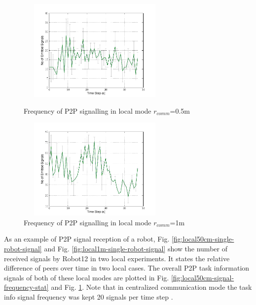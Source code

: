 \documentclass[letterpaper, 10 pt, times, conference]{ieeeconf} %
\begin{document}
\begin{figure}
\begin{minipage}[t]{0.5\linewidth}
\centering
\includegraphics[height=5cm,width=3in]
{images/local-500cm/Local-500cm-SignalingFreqStat}
\caption{\small Frequency of P2P signalling in local mode $r_{comm}$=0.5m}
\label{fig:local50cm-signal-frequency-stat} %
\end{minipage}
\hspace{0.5cm}
\begin{minipage}[t]{0.5\linewidth}
\centering
\includegraphics[height=5cm,width=3in]{images/local-1m/Local-1m-SignalingFreqStat}
\caption{\small Frequency of P2P signalling in local mode $r_{comm}$=1m}
\label{fig:local1cm-signal-frequency-stat} %
\end{minipage}
\end{figure}
%
As an example of P2P signal reception of a robot, Fig. \ref{fig:local50cm-single-robot-signal} and Fig. \ref{fig:local1m-single-robot-signal} show the number of received signals by Robot12 in two local experiments. It states the relative difference of peers over time in two local cases. The overall P2P task information signals of both of these local modes are plotted in Fig. \ref{fig:local50cm-signal-frequency-stat} and Fig. \ref{fig:local1cm-signal-frequency-stat}. Note that in centralized communication mode the task info signal frequency was kept 20 signals per time step \cite{Sarker}.\\ 
\end{document}

